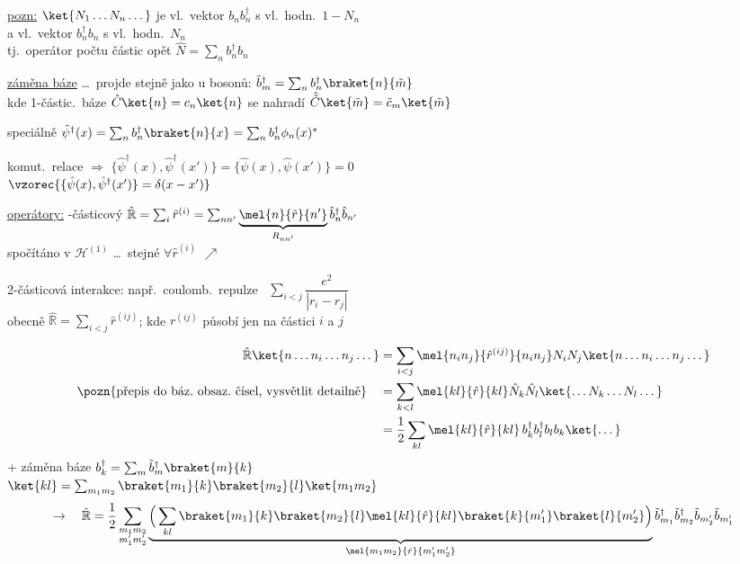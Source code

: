 \underline{pozn:} $\ket{N_1\dots N_n\dots}$ je vl.\ vektor $b_nb_n^\dagger$ s vl.\ hodn.\ $1 - N_n$ \\
\hspace*{3.6cm} a vl.\ vektor $b_n^\dagger b_n$ s vl.\ hodn.\ $N_n$ \\
\quad tj.\ operátor počtu částic opět \quad $\hat N = \sum_nb_n^\dagger b_n$

\underline{záměna báze} \dots\ projde stejně jako u bosonů: \quad $\tilde b_m^\dagger = \sum_nb_n^\dagger\braket{n}{\tilde m}$ \\
\quad kde 1-částic.\ báze $\hat C\ket{n} = c_n\ket{n}$ se nahradí $\hat{\tilde C}\ket{\tilde m} = \tilde c_m\ket{\tilde m}$

speciálně  \quad $\hat\psi^\dagger(x) = \sum_nb_n^\dagger\braket{n}{x} = \sum_nb_n^\dagger\phi_n(x)^*$

komut.\ relace $\Rightarrow$ \quad
$\{\hat\psi^\dagger(x),\hat\psi^\dagger(x')\} = \{\hat\psi(x),\hat\psi(x')\} = 0$ \\
\hspace*{3.85cm} $\vzorec{\{\hat\psi(x),\hat\psi^\dagger(x')\} = \delta(x - x')}$

\underline{operátory:} -částicový \quad
$\hat{\mathbb{R}} = \sum_i\hat r^{(i)} = \sum_{nn'}\underbrace{\mel{n}{\hat r}{n'}}_{R_{nn'}}\hat b_n^\dagger\hat b_{n'}$ \\
\hspace*{2.4cm} spočítáno v $\mathcal{H}^{(1)}$ \dots\ stejné $\forall\hat r^{(i)}$ $\nearrow$

2-částicová interakce: \quad např.\ coulomb.\ repulze \ $\sum_{i<j}\dfrac{e^2}{|r_i - r_j|}$ \\
obecně \quad $\hat{\mathbb{R}} = \sum_{i<j}\hat r^{(ij)}$; \quad kde $r^{(ij)}$ působí jen na částici $i$ a $j$

\begin{align*}
  \hat{\mathbb{R}}\ket{n\dots n_i\dots n_j\dots} &= \sum_{i<j}\mel{n_in_j}{\hat r^{(ij)}}{n_in_j}N_iN_j\ket{n\dots n_i\dots n_j\dots} \\
  \text{\pozn{přepis do báz.\ obsaz.\ čísel, vysvětlit detailně}}\quad
  &= \sum_{k<l}\mel{kl}{\hat r}{kl}\hat N_k\hat N_l\ket{\dots N_k\dots N_l\dots} \\
  &= \frac12\sum_{kl}\mel{kl}{\hat r}{kl}\,b_k^\dagger b_l^\dagger b_lb_k\ket{\dots}
\end{align*}
+ záměna báze \quad $b_k^\dagger = \sum_m\tilde b_m^\dagger\braket{m}{k}$ \\
\hspace*{3cm} $\ket{kl} = \sum_{m_1m_2}\braket{m_1}{k}\braket{m_2}{l}\ket{m_1m_2}$
\[
  \to\quad \hat{\mathbb{R}} = \frac12\sum_{\substack{m_1m_2\\ m_1'm_2'}}
  \underbrace{\Big(\sum_{kl}\braket{m_1}{k}\braket{m_2}{l}\mel{kl}{\hat r}{kl}\braket{k}{m_1'}\braket{l}{m_2'}\Big)}_{\mel{m_1m_2}{\hat r}{m_1'm_2'}}
  \tilde b_{m_1}^\dagger\tilde b_{m_2}^\dagger\tilde b_{m_2'}\tilde b_{m_1'}
\]

